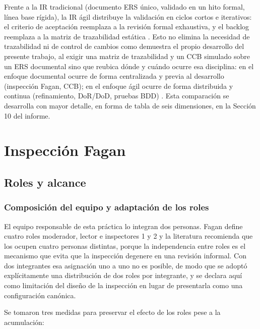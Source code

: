 \documentclass[journal,onecolumn]{IEEEtran}
\begin{document}
	Frente a la IR tradicional (documento ERS único, validado en un hito formal, línea base rígida), la IR ágil distribuye la validación en ciclos cortos e iterativos: el criterio de aceptación reemplaza a la revisión formal exhaustiva, y el backlog reemplaza a la matriz de trazabilidad estática \cite{hoyxu2023}. Esto no elimina la necesidad de trazabilidad ni de control de cambios como demuestra el propio desarrollo del presente trabajo, al exigir una matriz de trazabilidad y un CCB simulado sobre un ERS documental sino que reubica dónde y cuándo ocurre esa disciplina: en el enfoque documental ocurre de forma centralizada y previa al desarrollo (inspección Fagan, CCB); en el enfoque ágil ocurre de forma distribuida y continua (refinamiento, DoR/DoD, pruebas BDD) \cite{hoyxu2023}. Esta comparación se desarrolla con mayor detalle, en forma de tabla de seis dimensiones, en la Sección 10 del informe.
	
	\newpage
	\section{Inspección Fagan}
	
	\subsection{Roles y alcance}
	
	\subsubsection{Composición del equipo y adaptación de los roles}
	
	El equipo responsable de esta práctica lo integran dos personas. Fagan define
	cuatro roles moderador, lector e inspectores 1 y 2 y la literatura recomienda
	que los ocupen cuatro personas distintas, porque la independencia entre roles
	es el mecanismo que evita que la inspección degenere en una revisión
	informal. Con dos integrantes esa asignación uno a uno no es posible, de modo
	que se adoptó explícitamente una distribución de dos roles por integrante, y
	se declara aquí como limitación del diseño de la inspección en lugar de
	presentarla como una configuración canónica.
	
	Se tomaron tres medidas para preservar el efecto de los roles pese a la
	acumulación:
	
\end{document}
